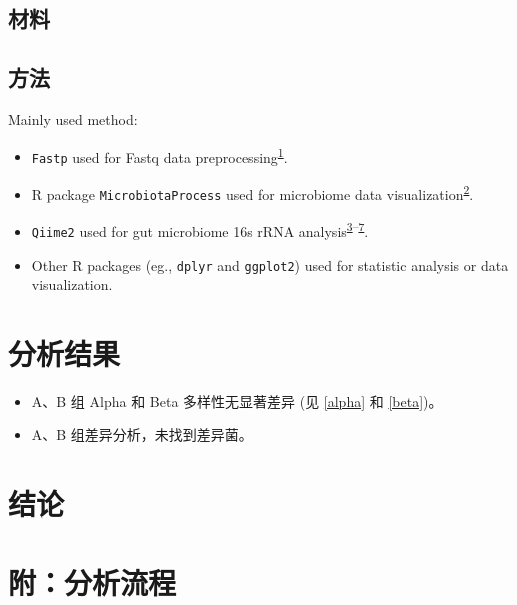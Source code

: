 \documentclass[
]{article}
\providecommand{\tightlist}{%
  \setlength{\itemsep}{0pt}\setlength{\parskip}{0pt}}
\begin{document}
\hypertarget{ux6750ux6599}{%
\subsection{材料}\label{ux6750ux6599}}

\hypertarget{ux65b9ux6cd5}{%
\subsection{方法}\label{ux65b9ux6cd5}}

Mainly used method:

\begin{itemize}
\tightlist
\item
  \texttt{Fastp} used for Fastq data preprocessing\textsuperscript{\protect\hyperlink{ref-UltrafastOnePChen2023}{1}}.
\item
  R package \texttt{MicrobiotaProcess} used for microbiome data visualization\textsuperscript{\protect\hyperlink{ref-MicrobiotaproceXuSh2023}{2}}.
\item
  \texttt{Qiime2} used for gut microbiome 16s rRNA analysis\textsuperscript{\protect\hyperlink{ref-ReproducibleIBolyen2019}{3}--\protect\hyperlink{ref-MicrobialCommuHamday2009}{7}}.
\item
  Other R packages (eg., \texttt{dplyr} and \texttt{ggplot2}) used for statistic analysis or data visualization.
\end{itemize}

\hypertarget{results}{%
\section{分析结果}\label{results}}

\begin{itemize}
\tightlist
\item
  A、B 组 Alpha 和 Beta 多样性无显著差异 (见 \ref{alpha} 和 \ref{beta})。
\item
  A、B 组差异分析，未找到差异菌。
\end{itemize}

\hypertarget{dis}{%
\section{结论}\label{dis}}

\hypertarget{workflow}{%
\section{附：分析流程}\label{workflow}}
\end{document}
